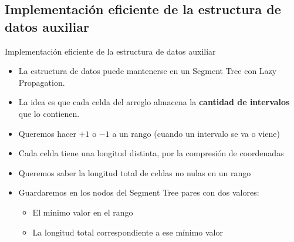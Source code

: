 \documentclass[compress]{beamer}
\begin{document}
\subsection{Implementación eficiente de la estructura de datos auxiliar}

\begin{frame}{Implementación eficiente de la estructura de datos auxiliar}
    \begin{itemize}
        \item La estructura de datos puede mantenerse en un Segment Tree con Lazy Propagation.
        \item La idea es que cada celda del arreglo almacena la \textbf{cantidad de intervalos} que lo contienen.
        \item Queremos hacer $+1$ o $-1$ a un rango (cuando un intervalo se va o viene)
        \item Cada celda tiene una longitud distinta, por la compresión de coordenadas
        \item Queremos saber la longitud total de celdas no nulas en un rango
        \item Guardaremos en los nodos del Segment Tree pares con dos valores:
            \begin{itemize}
                \item El mínimo valor en el rango
                \item La longitud total correspondiente a ese mínimo valor
            \end{itemize}
    \end{itemize}
\end{frame}
\end{document}
